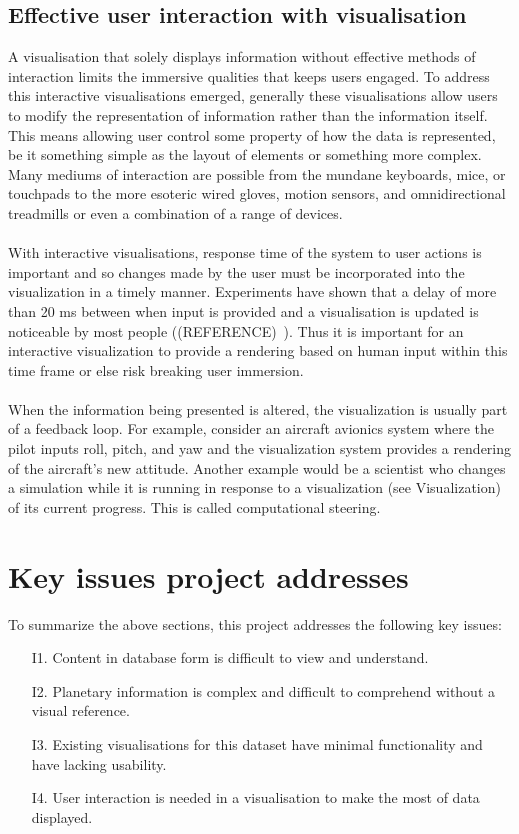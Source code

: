 \subsection{Effective user interaction with visualisation}
A visualisation that solely displays information without effective methods of interaction limits the immersive qualities that keeps users engaged. To address this interactive visualisations emerged, generally these visualisations allow users to modify the representation of information rather than the information itself. This means allowing user control some property of how the data is represented, be it something simple as the layout of elements or something more complex. Many mediums of interaction are possible from the mundane keyboards, mice, or touchpads to the more esoteric wired gloves, motion sensors, and omnidirectional treadmills or even a combination of a range of devices.
\\\\
With interactive visualisations, response time of the system to user actions is important and so changes made by the user must be incorporated into the visualization in a timely manner. Experiments have shown that a delay of more than 20 ms between when input is provided and a visualisation is updated is noticeable by most people ((REFERENCE)~). Thus it is important for an interactive visualization to provide a rendering based on human input within this time frame or else risk breaking user immersion.
\\\\

When the information being presented is altered, the visualization is usually part of a feedback loop. For example, consider an aircraft avionics system where the pilot inputs roll, pitch, and yaw and the visualization system provides a rendering of the aircraft's new attitude. Another example would be a scientist who changes a simulation while it is running in response to a visualization (see Visualization) of its current progress. This is called computational steering.

\section{Key issues project addresses}
To summarize the above sections, this project addresses the following key issues:
\begin{enumerate}
 \item[I1.] Content in database form is difficult to view and understand.
 \item[I2.] Planetary information is complex and difficult to comprehend without a visual reference.
 \item[I3.] Existing visualisations for this dataset have minimal functionality and have lacking usability.
 \item[I4.] User interaction is needed in a visualisation to make the most of data displayed.
\end{enumerate}

